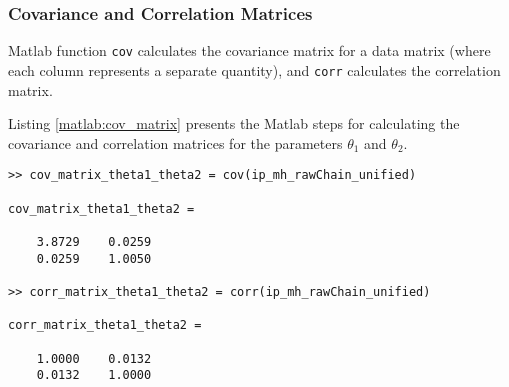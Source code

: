 \subsubsection{Covariance and Correlation Matrices}

Matlab function \verb+cov+ calculates the covariance matrix for a data matrix (where each column represents a separate quantity), 
and \verb+corr+ calculates the correlation matrix.

Listing \ref{matlab:cov_matrix} presents the Matlab steps for calculating the covariance and correlation matrices for the parameters $\theta_1$ and $\theta_2$.

\newpage

\begin{lstlisting}[label=matlab:ip_cov_matrix,caption={Matlab code for finding covariance and correlation matrices.}]
% inside Matlab
>> cov_matrix_theta1_theta2 = cov(ip_mh_rawChain_unified)

cov_matrix_theta1_theta2 =

    3.8729    0.0259
    0.0259    1.0050
    
>> corr_matrix_theta1_theta2 = corr(ip_mh_rawChain_unified)

corr_matrix_theta1_theta2 =

    1.0000    0.0132
    0.0132    1.0000    
\end{lstlisting}

